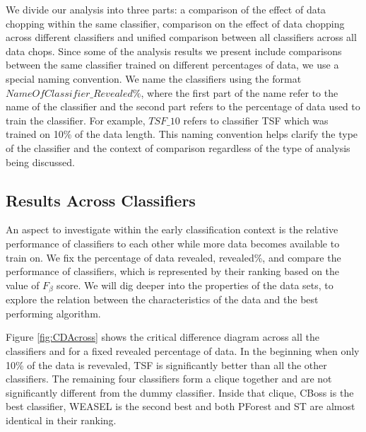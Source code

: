 We divide our analysis into three parts: a comparison of the effect of data chopping within the same classifier,
comparison on the effect of data chopping across different classifiers and unified comparison between all classifiers
across all data chops.
Since some of the analysis results we present include comparisons between the same classifier trained on different percentages of data, we use a special naming convention.
We name the classifiers using the format $NameOfClassifier\_Revealed\%$, where the first part of the name refer to the name of the classifier
and the second part refers to the percentage of data used to train the classifier. For example, $TSF\_10$ refers to classifier TSF which was trained on 10\% of the data length.
This naming convention helps clarify the type of the classifier and the context of comparison regardless of the type of analysis being discussed.


\subsection{Results Across Classifiers}
\label{SubsectionAcrossComparison}
An aspect to investigate within the early classification context is the relative performance of classifiers to each other while more data becomes available to train on.
We fix the percentage of data revealed, revealed\%, and compare the performance of classifiers, which is represented by their ranking based on the value of $F_{\beta}$ score.
We will dig deeper into the properties of the data sets, to explore the relation between the characteristics of the data and the best performing algorithm.

Figure \ref{fig:CDAcross} shows the critical difference diagram across all the classifiers and for a fixed revealed percentage of data.
In the beginning when only 10\% of the data is revevaled, TSF is significantly better than all the other classifiers.
The remaining four classifiers form a clique together and are not significantly different from the dummy classifier.
Inside that clique, CBoss is the best classifier, WEASEL is the second best and both PForest and ST are almost identical in their ranking.

